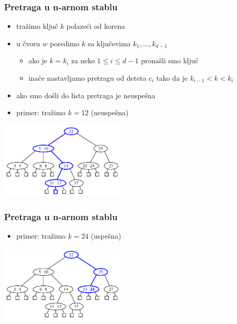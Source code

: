 \documentclass[compress,aspectratio=169]{beamer}
\begin{document}
\begin{frame}[fragile]
  \frametitle{Pretraga u n-arnom stablu}
  \begin{itemize}
    \item tražimo ključ $k$ polazeći od korena
    \item u čvoru $w$ poredimo $k$ sa ključevima $k_1, \ldots, k_{d-1}$
    \begin{itemize}
      \item ako je $k=k_i$ za neko $1\leq i\leq d-1$ pronašli smo ključ
      \item inače nastavljamo pretragu od deteta $c_i$ tako da je $k_{i-1}<k<k_i$ 
    \end{itemize}
    \item ako smo došli do lista pretraga je neuspešna
    \item primer: tražimo $k=12$ (neuspešna)
  \end{itemize}
  \begin{center}
    \includegraphics[width=6cm]{asp-11-pic28.pdf}
  \end{center}
\end{frame}

\begin{frame}[fragile]
  \frametitle{Pretraga u n-arnom stablu}
  \begin{itemize}
    \item primer: tražimo $k=24$ (uspešna)
  \end{itemize}
  \begin{center}
    \includegraphics[width=6cm]{asp-11-pic29.pdf}
  \end{center}
\end{frame}
\end{document}
